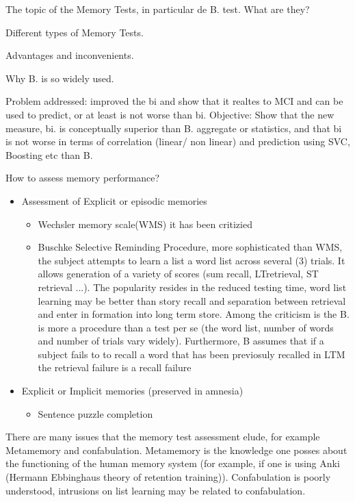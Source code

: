 \documentclass[11pt]{article}
\begin{document}
The topic of the Memory Tests, in particular de B. test. 
What are they?  

Different types of Memory Tests. 

Advantages and inconvenients. 

Why B. is so widely used.

Problem addressed: improved the bi and show that it realtes to MCI and can be used to predict, or at least is not worse than bi.
Objective: Show that the new measure, bi. is conceptually superior than B. aggregate or statistics, and that bi is not worse in terms of correlation (linear/ non linear) and prediction using SVC, Boosting etc than B.

How to assess memory performance?
\begin{itemize}
  \item Assessment of Explicit or episodic memories 
  \begin{itemize}
    \item Wechsler memory scale(WMS) it has been critizied
    \item Buschke Selective Reminding Procedure, more sophisticated than WMS, the subject attempts to learn a list a word list across several (3) trials. It allows generation of a variety of scores (sum recall, LTretrieval, ST retrieval ...). The popularity resides in the reduced testing time, word list learning may be better than story recall and separation between retrieval and enter in formation into long term store. Among the criticism is the B. is more a procedure than a test per se (the word list, number of words and number of trials vary widely). Furthermore, B assumes that if a subject fails to to recall a word that has been previosuly recalled in LTM the retrieval failure is a recall failure
  \end{itemize}  
  \item Explicit or Implicit memories (preserved in amnesia)
    \begin{itemize}
      \item  Sentence puzzle completion
    \end{itemize}
\end{itemize}  
There are many issues that the memory test assessment elude, for example Metamemory and confabulation. Metamemory is the knowledge one posses about the functioning of the human memory system (for example, if one is using Anki (Hermann Ebbinghaus theory of retention training)). Confabulation is poorly understood, intrusions on list learning may be related to confabulation.
\end{document}
